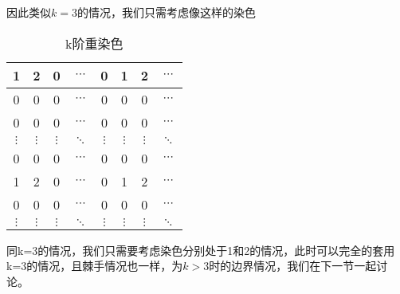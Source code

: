 因此类似$k=3$的情况，我们只需考虑像这样的染色

\begin{table}[h]
	\centering
	\caption{k阶重染色}
	\begin{tabular}{|c|c|c|c|c|c|c|c|}
		\hline
		1        & 2        & 0        & $\cdots$ & 0        & 1        & 2        & $\cdots$ \\
		\hline
		0        & 0        & 0        & $\cdots$ & 0        & 0        & 0        & $\cdots$ \\
		\hline
		0        & 0        & 0        & $\cdots$ & 0        & 0        & 0        & $\cdots$ \\
		\hline
		$\vdots$ & $\vdots$ & $\vdots$ & $\ddots$ & $\vdots$ & $\vdots$ & $\vdots$ & $\ddots$ \\
		\hline
		0        & 0        & 0        & $\cdots$ & 0        & 0        & 0        & $\cdots$ \\
		\hline
		1        & 2        & 0        & $\cdots$ & 0        & 1        & 2        & $\cdots$ \\
		\hline
		0        & 0        & 0        & $\cdots$ & 0        & 0        & 0        & $\cdots$ \\
		\hline
		$\vdots$ & $\vdots$ & $\vdots$ & $\ddots$ & $\vdots$ & $\vdots$ & $\vdots$ & $\ddots$ \\
		\hline
	\end{tabular}
	\label{fig:k-order-staining-last}
\end{table}

同k=3的情况，我们只需要考虑染色分别处于1和2的情况，此时可以完全的套用k=3的情况，且棘手情况也一样，为$k>3$时的边界情况，我们在下一节一起讨论。

\clearpage